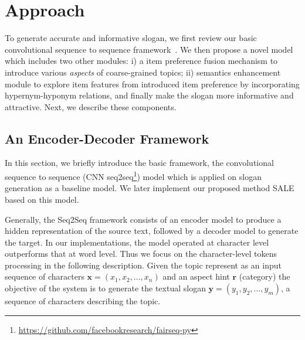 \section{Approach}
\label{sec:approach}


To generate accurate and informative slogan,
we first review our basic convolutional 
sequence to sequence framework~\cite{gehring2017convolutional}. 
We then propose a novel model which includes 
two other modules:  
i) a item preference fusion mechanism to introduce various 
\emph{aspects} of coarse-grained topics;
ii) semantics enhancement module to explore item features from introduced item preference by incorporating hypernym-hyponym relations, and finally make the slogan more informative and attractive.
Next, we describe these components.


\subsection{An Encoder-Decoder Framework}
\label{sec:baseline}
In this section, we briefly introduce the basic framework, the convolutional sequence to sequence (CNN seq2seq\footnote{\url{https://github.com/facebookresearch/fairseq-py}}) model which is applied on slogan generation as a baseline model.
We later implement our proposed method SALE based on this model.

Generally, the Seq2Seq framework consists of an encoder model to produce
a hidden representation of the source text, followed by a decoder model
to generate the target.
In our implementations, the model operated at character level outperforms that at word level. 
Thus we focus on the character-level tokens
processing in the following description.
Given the topic represent as an input sequence of characters
$\mathbf{ x } = (x_1, x_2, ..., x_n) $ and an aspect hint $\mathbf{r}$ (category) 
the objective of the system is to generate the textual slogan
$\mathbf{ y } = (y_1, y_2, ..., y_m) $,
a sequence of characters describing the topic.


